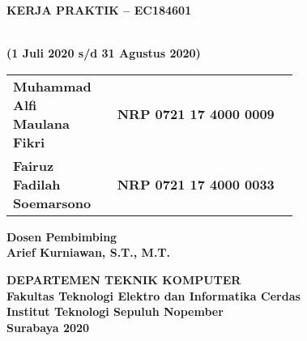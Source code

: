 

\begin{flushleft}

  \sffamily

  \noindent\textbf{KERJA PRAKTIK – EC184601}
  \vspace{4ex}

   \\
  \textbf{(1 Juli 2020 s/d 31 Agustus 2020)}
  \vspace{6ex}

  \vspace{6ex}

  \begin{adjustwidth}{-0.2cm}{}
    \begin{tabular}{lcp{0.7\linewidth}}
      \textbf{Muhammad Alfi Maulana Fikri} & & \textbf{NRP 0721 17 4000 0009} \\
      \textbf{Fairuz Fadilah Soemarsono} & & \textbf{NRP 0721 17 4000 0033} \\
    \end{tabular}
  \end{adjustwidth}
  \vspace{4ex}

  \noindent
  \textbf{Dosen Pembimbing} \\
  \textbf{Arief Kurniawan, S.T., M.T.}
  \vspace{12ex}

  \noindent\textbf{DEPARTEMEN TEKNIK KOMPUTER} \\
  \textbf{Fakultas Teknologi Elektro dan Informatika Cerdas} \\
  \textbf{Institut Teknologi Sepuluh Nopember} \\
  \textbf{Surabaya 2020}

\end{flushleft}

\restoregeometry
